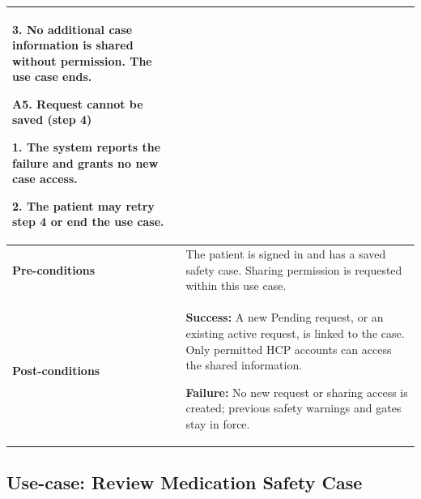 \begin{longtable}{|p{}|p{}|}
3. No additional case information
is shared without permission.
The use case ends.
\par\smallskip
\textbf{A5. Request cannot be saved (step 4)}\par
1. The system reports the failure and grants no new case access.\par
2. The patient may retry step 4 or end the use case.
\\ \hline
\textbf{Pre-conditions} & The patient is signed in and has a saved safety case. Sharing permission is requested within this use case. \\ \hline
\textbf{Post-conditions} & \textbf{Success:} A new Pending request, or an existing active request, is linked to the case. Only permitted HCP accounts can access the shared information.\par
\textbf{Failure:} No new request or sharing access is created; previous safety warnings and gates stay in force. \\ \hline
\end{longtable}


\subsection{Use-case: Review Medication Safety Case}
\label{uc:uc-05}

